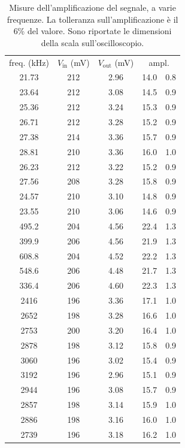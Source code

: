 \documentclass[italian,a4paper]{article}
\begin{document}
\begin{table}[h] \caption{Misure dell'amplificazione del segnale, a varie frequenze. La tolleranza sull'amplificazione è il 6\% del valore. Sono riportate le dimensioni della scala sull'oscilloscopio.}
    \label{tab:amplificazione}
    \centering
    \begin{tabular}{*3c r@{ $\pm$ }l}
    freq. (\unit[]{kHz}) &  $V_\text{in}$ (\unit[50]{mV}) & $ V_\text{out}$
    (\unit[500]{mV}) & \multicolumn{2}{c}{ampl.}\\
21.73  &  212   &  2.96  & 14.0 & 0.8\\
23.64   &  212  &  3.08  & 14.5 & 0.9\\
25.36   &  212  &  3.24  & 15.3 & 0.9\\
26.71   &  212  &  3.28  & 15.2 & 0.9\\
27.38   &  214  &  3.36  & 15.7 & 0.9\\
28.81   &  210  &  3.36  & 16.0 & 1.0\\
26.23   &  212  &  3.22  & 15.2 & 0.9\\
27.56   &  208  &  3.28  & 15.8 & 0.9\\
24.57   &  210  &  3.10  & 14.8 & 0.9\\
23.55   &  210  &  3.06  & 14.6 & 0.9\\
495.2  &  204  &  4.56  & 22.4 & 1.3\\
399.9  &  206  &  4.56  & 21.9 & 1.3\\
608.8  &  204  &  4.52  & 22.2 & 1.3\\
548.6  &  206  &  4.48  & 21.7 & 1.3\\
336.4  &  206  &  4.60  & 22.3 & 1.3\\
2416    &  196  &  3.36  & 17.1 & 1.0\\
2652   &  198  &  3.28  & 16.6 & 1.0\\
2753   &  200  &  3.20  & 16.4 & 1.0\\
2878   &  198  &  3.12  & 15.8 & 0.9\\
3060   &  196  &  3.02  & 15.4 & 0.9\\
3192   &  196  &  2.96  & 15.1 & 0.9\\
2944   &  196  &  3.08  & 15.7 & 0.9\\
2857   &  198  &  3.14  & 15.9 & 1.0\\
2886   &  198  &  3.16  & 16.0 & 1.0\\
2739   &  196  &  3.18  & 16.2 & 1.0\\
\end{tabular}
\end{table}\\
\end{document}
